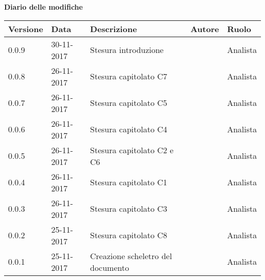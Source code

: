 \documentclass[StudioDiFattibilità.tex]{subfiles}
\begin{document}
\huge \bfseries Diario delle modifiche\\
\begin{table}[htbp]
	\centering
	\renewcommand\arraystretch{1.2}

	\begin{tabularx}{\textwidth}{p{2cm}|p{2cm}|p{4cm}|p{2cm}|p{3cm}}
		\hline
		\textbf{Versione} & \textbf{Data} & \textbf{Descrizione} & \textbf{Autore} & \textbf{Ruolo}\\

		\hline
		0.0.9 & 30-11-2017 & Stesura introduzione & \Elena & Analista\\

		\hline
		0.0.8 & 26-11-2017 & Stesura capitolato C7 & \Gianluca & Analista\\

		\hline
		0.0.7 & 26-11-2017 & Stesura capitolato C5 & \Parwinder & Analista\\
		
		\hline
		0.0.6 & 26-11-2017 & Stesura capitolato C4 & \Valentina & Analista\\
		
		\hline
		0.0.5 & 26-11-2017 & Stesura capitolato C2 e C6 & \Mirco & Analista \\

		\hline
		0.0.4 & 26-11-2017 & Stesura capitolato C1 & \Riccardo & Analista \\
		
		\hline
		0.0.3 & 26-11-2017 & Stesura capitolato C3 & \Davide & Analista \\
		
		\hline
		0.0.2 & 25-11-2017 & Stesura capitolato C8 & \Elena & Analista \\
		
		\hline
		0.0.1 & 25-11-2017 & Creazione scheletro del documento & \Valentina & Analista \\
		\hline
	
	\end{tabularx}

\end{table}
\end{document}
